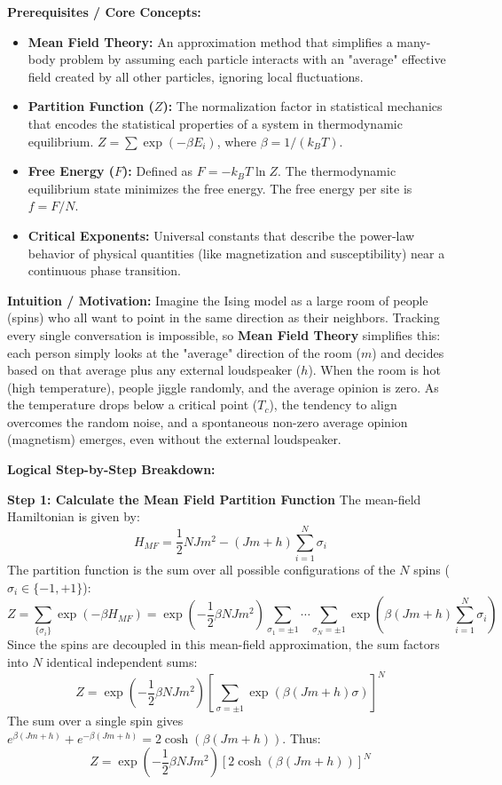 \begin{solution}
\textbf{Prerequisites / Core Concepts:}
\begin{itemize}
    \item \textbf{Mean Field Theory:} An approximation method that simplifies a many-body problem by assuming each particle interacts with an "average" effective field created by all other particles, ignoring local fluctuations.
    \item \textbf{Partition Function ($Z$):} The normalization factor in statistical mechanics that encodes the statistical properties of a system in thermodynamic equilibrium. $Z = \sum \exp(-\beta E_i)$, where $\beta = 1/(k_B T)$.
    \item \textbf{Free Energy ($F$):} Defined as $F = -k_B T \ln Z$. The thermodynamic equilibrium state minimizes the free energy. The free energy per site is $f = F/N$.
    \item \textbf{Critical Exponents:} Universal constants that describe the power-law behavior of physical quantities (like magnetization and susceptibility) near a continuous phase transition.
\end{itemize}

\textbf{Intuition / Motivation:}
Imagine the Ising model as a large room of people (spins) who all want to point in the same direction as their neighbors. Tracking every single conversation is impossible, so \textbf{Mean Field Theory} simplifies this: each person simply looks at the "average" direction of the room ($m$) and decides based on that average plus any external loudspeaker ($h$).
When the room is hot (high temperature), people jiggle randomly, and the average opinion is zero. As the temperature drops below a critical point ($T_c$), the tendency to align overcomes the random noise, and a spontaneous non-zero average opinion (magnetism) emerges, even without the external loudspeaker.

\textbf{Logical Step-by-Step Breakdown:}

\textbf{Step 1: Calculate the Mean Field Partition Function}
The mean-field Hamiltonian is given by:
\[ H_{MF} = \frac{1}{2} N J m^2 - (J m + h) \sum_{i=1}^N \sigma_i \]
The partition function is the sum over all possible configurations of the $N$ spins ($\sigma_i \in \{-1, +1\}$):
\[ Z = \sum_{\{\sigma_i\}} \exp(-\beta H_{MF}) = \exp\left(-\frac{1}{2} \beta N J m^2\right) \sum_{\sigma_1=\pm 1} \cdots \sum_{\sigma_N=\pm 1} \exp\left( \beta (J m + h) \sum_{i=1}^N \sigma_i \right) \]
Since the spins are decoupled in this mean-field approximation, the sum factors into $N$ identical independent sums:
\[ Z = \exp\left(-\frac{1}{2} \beta N J m^2\right) \left[ \sum_{\sigma=\pm 1} \exp(\beta (J m + h) \sigma) \right]^N \]
The sum over a single spin gives $e^{\beta(Jm+h)} + e^{-\beta(Jm+h)} = 2 \cosh(\beta(Jm+h))$. Thus:
\[ Z = \exp\left(-\frac{1}{2} \beta N J m^2\right) \left[ 2 \cosh(\beta(Jm+h)) \right]^N \]


\end{solution}
